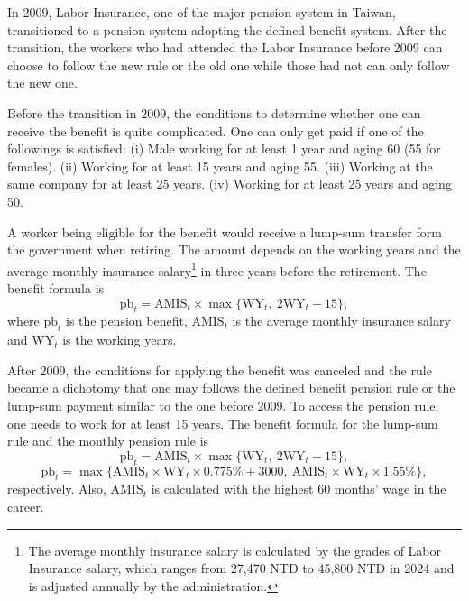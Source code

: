 \documentclass[12pt]{article}
\begin{document}
\begin{CJK*}{UTF8}{bsmi}
In 2009, Labor Insurance, one of the major pension system in 
Taiwan, transitioned to a pension system adopting the defined 
benefit system. After the transition, the workers who had 
attended the Labor Insurance before 2009 can choose to follow 
the new rule or the old one while those had not can only 
follow the new one. 

Before the transition in 2009, the conditions to determine 
whether one can receive the benefit is quite complicated. 
One can only get paid if one of the followings is satisfied: 
(i) Male working for at least 1 year and aging 60 (55 for 
females). (ii) Working for at least 15 years and aging 55. 
(iii) Working at the same company for at least 25 years. 
(iv) Working for at least 25 years and aging 50.

A worker being eligible for the benefit would receive a 
lump-sum transfer form the government when retiring. The 
amount depends on the working years and the average monthly 
insurance salary\footnote{The average monthly insurance 
salary is calculated by the grades of Labor Insurance 
salary, which ranges from 27,470 NTD to 45,800 NTD in 2024 
and is adjusted annually by the administration.} in three 
years before the retirement. The benefit formula is
\begin{equation}
    \text{pb}_t = \text{AMIS}_t\times
    \max\{\text{WY}_t,\ 2\text{WY}_t-15\},
\end{equation}
where $\text{pb}_t$ is the pension benefit, $\text{AMIS}_t$ 
is the average monthly insurance salary and $\text{WY}_t$ is 
the working years.

After 2009, the conditions for applying the benefit was 
canceled and the rule became a dichotomy that one may 
follows the defined benefit pension rule or the lump-sum 
payment similar to the one before 2009. To access the pension 
rule, one needs to work for at least 15 years. The benefit 
formula for the lump-sum rule and the monthly pension rule is 
\begin{equation}\label{eq:pblumpsum}
    \text{pb}_t = \text{AMIS}_t\times
    \max\{\text{WY}_t,\ 2\text{WY}_t-15\},
\end{equation}
\begin{equation}\label{eq:pbmonthly}
    \text{pb}_t = 
    \max\{\text{AMIS}_t\times\text{WY}_t\times0.775\%+3000,\ 
    \text{AMIS}_t\times\text{WY}_t\times 1.55\%\},
\end{equation}
respectively. Also, $\text{AMIS}_t$ is calculated with the 
highest 60 months' wage in the career.


\end{CJK*}
\end{document}
